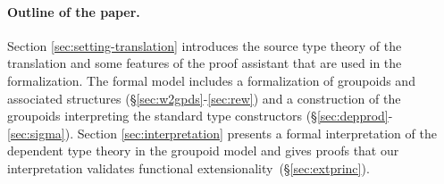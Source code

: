 

\paragraph{\bf Outline of the paper.}
Section \ref{sec:setting-translation} introduces the source type
theory of the translation and some features of the proof assistant
that are used in the formalization. The formal model includes a
formalization of groupoids and associated structures
(\S\ref{sec:w2gpds}-\ref{sec:rew}) and a construction of the groupoids
interpreting the standard type constructors
(\S\ref{sec:depprod}-\ref{sec:sigma}). Section
\ref{sec:interpretation} presents a formal interpretation of the
dependent type theory in the groupoid model and gives proofs that our
interpretation validates functional extensionality~(\S\ref{sec:extprinc}).
%


